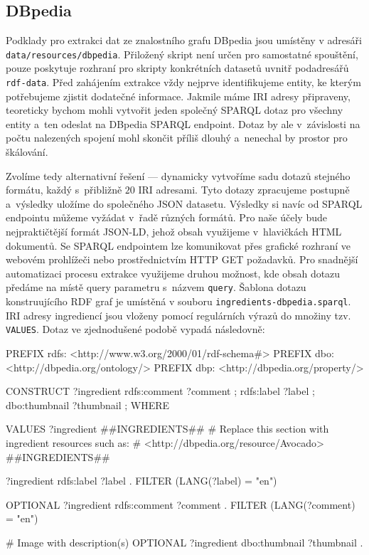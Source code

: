 \subsection{DBpedia}

Podklady pro extrakci dat ze znalostního grafu DBpedia jsou umístěny v adresáři \texttt{data/resources/dbpedia}. Přiložený skript není určen pro samostatné spouštění, pouze poskytuje rozhraní pro skripty konkrétních datasetů uvnitř podadresářů \texttt{rdf-data}. Před zahájením extrakce vždy nejprve identifikujeme entity, ke kterým potřebujeme zjistit dodatečné informace. Jakmile máme IRI adresy připraveny, teoreticky bychom mohli vytvořit jeden společný SPARQL dotaz pro všechny entity a~ten odeslat na DBpedia SPARQL endpoint. Dotaz by ale v~závislosti na počtu nalezených spojení mohl skončit příliš dlouhý a~nenechal by prostor pro škálování.

Zvolíme tedy alternativní řešení --- dynamicky vytvoříme sadu dotazů stejného formátu, každý s~přibližně $20$ IRI adresami. Tyto dotazy zpracujeme postupně a~výsledky uložíme do společného JSON datasetu. Výsledky si navíc od SPARQL endpointu můžeme vyžádat v~řadě různých formátů. Pro naše účely bude nejpraktičtější formát JSON-LD, jehož obsah využijeme v~hlavičkách HTML dokumentů. Se SPARQL endpointem lze komunikovat přes grafické rozhraní ve webovém prohlížeči nebo prostřednictvím HTTP GET požadavků. Pro snadnější automatizaci procesu extrakce využijeme druhou možnost, kde obsah dotazu předáme na místě query parametru s~názvem \texttt{query}. Šablona dotazu konstruujícího RDF graf je umístěná v souboru \texttt{ingredients-dbpedia.sparql}. IRI adresy ingrediencí jsou vloženy pomocí regulárních výrazů do množiny tzv. \texttt{VALUES}. Dotaz ve zjednodušené podobě vypadá následovně:

\begin{code}
PREFIX rdfs: <http://www.w3.org/2000/01/rdf-schema#>
PREFIX dbo: <http://dbpedia.org/ontology/>
PREFIX dbp: <http://dbpedia.org/property/>

CONSTRUCT {
    ?ingredient rdfs:comment ?comment ;
                rdfs:label ?label ;
                dbo:thumbnail ?thumbnail ;
}
WHERE {
    VALUES ?ingredient { 
        ##INGREDIENTS## 
        # Replace this section with ingredient resources such as:
        # <http://dbpedia.org/resource/Avocado>
        ##INGREDIENTS##
    }

    ?ingredient rdfs:label ?label .
    FILTER (LANG(?label) = "en")
    
    OPTIONAL {
        ?ingredient rdfs:comment ?comment .
        FILTER (LANG(?comment) = "en")
    }

    # Image with description(s)
    OPTIONAL {?ingredient dbo:thumbnail ?thumbnail .}
}
\end{code}

